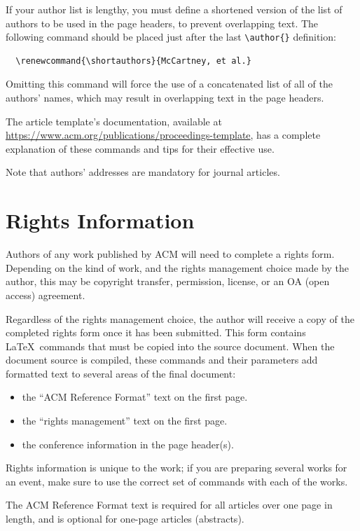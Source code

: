If your author list is lengthy, you must define a shortened version of
the list of authors to be used in the page headers, to prevent
overlapping text. The following command should be placed just after
the last \verb|\author{}| definition:
\begin{verbatim}
  \renewcommand{\shortauthors}{McCartney, et al.}
\end{verbatim}
Omitting this command will force the use of a concatenated list of all
of the authors' names, which may result in overlapping text in the
page headers.

The article template's documentation, available at
\url{https://www.acm.org/publications/proceedings-template}, has a
complete explanation of these commands and tips for their effective
use.

Note that authors' addresses are mandatory for journal articles.

\section{Rights Information}

Authors of any work published by ACM will need to complete a rights
form. Depending on the kind of work, and the rights management choice
made by the author, this may be copyright transfer, permission,
license, or an OA (open access) agreement.

Regardless of the rights management choice, the author will receive a
copy of the completed rights form once it has been submitted. This
form contains \LaTeX\ commands that must be copied into the source
document. When the document source is compiled, these commands and
their parameters add formatted text to several areas of the final
document:
\begin{itemize}
\item the ``ACM Reference Format'' text on the first page.
\item the ``rights management'' text on the first page.
\item the conference information in the page header(s).
\end{itemize}

Rights information is unique to the work; if you are preparing several
works for an event, make sure to use the correct set of commands with
each of the works.

The ACM Reference Format text is required for all articles over one
page in length, and is optional for one-page articles (abstracts).

